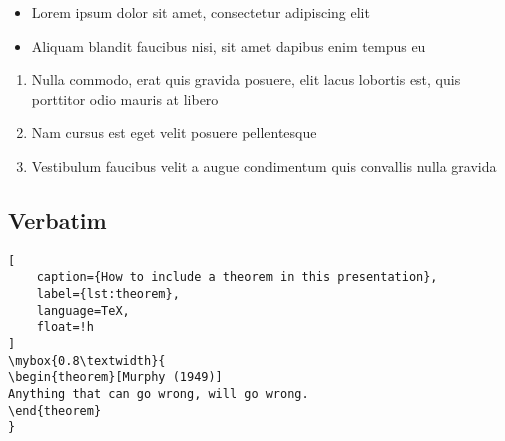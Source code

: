 \begin{itemize}
    \item Lorem ipsum dolor sit amet, consectetur adipiscing elit
    \item Aliquam blandit faucibus nisi, sit amet dapibus enim tempus eu
\end{itemize}

\begin{enumerate}
    \item Nulla commodo, erat quis gravida posuere, elit lacus lobortis est, quis porttitor odio mauris at libero
    \item Nam cursus est eget velit posuere pellentesque
    \item Vestibulum faucibus velit a augue condimentum quis convallis nulla gravida
\end{enumerate}

\clearpage


\subsection{Verbatim}

\begin{lstlisting}[
    caption={How to include a theorem in this presentation},
    label={lst:theorem},
    language=TeX,
    float=!h
]
\mybox{0.8\textwidth}{
\begin{theorem}[Murphy (1949)]
Anything that can go wrong, will go wrong.
\end{theorem}
}
\end{lstlisting}

\clearpage